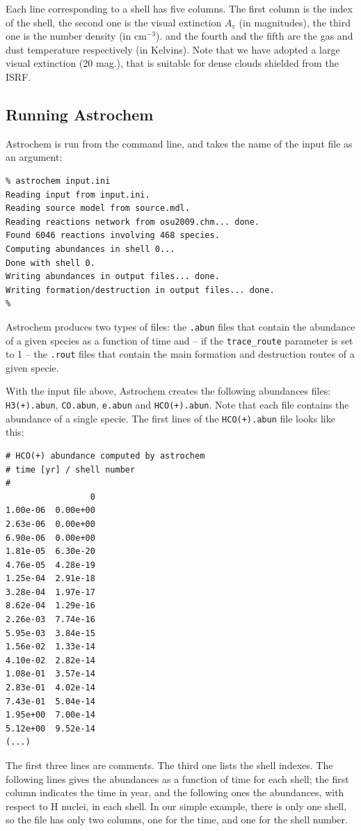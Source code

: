 \documentclass[a4paper,12pt]{article}
\begin{document}
Each line corresponding to a shell has five columns. The first column
is the index of the shell, the second one is the visual extinction
$A_{v}$ (in magnitudes), the third one is the number density (in
cm$^{-3}$). and the fourth and the fifth are the gas and dust
temperature respectively (in Kelvins).  Note that we have adopted a
large visual extinction (20 mag.), that is suitable for dense clouds
shielded from the ISRF.

\subsection{Running Astrochem}
\label{sec:running-astrochem}

Astrochem is run from the command line, and takes the name of the
input file as an argument:

\begin{verbatim}
% astrochem input.ini
Reading input from input.ini.
Reading source model from source.mdl.
Reading reactions network from osu2009.chm... done.
Found 6046 reactions involving 468 species.
Computing abundances in shell 0...
Done with shell 0.
Writing abundances in output files... done.
Writing formation/destruction in output files... done.
%
\end{verbatim}

Astrochem produces two types of files: the \verb=.abun= files that
contain the abundance of a given species as a function of time and --
if the \verb=trace_route= parameter is set to 1 -- the \verb=.rout=
files that contain the main formation and destruction routes of a
given specie.

With the input file above, Astrochem creates the following abundances
files: \verb=H3(+).abun=, \verb=CO.abun=, \verb=e.abun= and
\verb=HCO(+).abun=. Note that each file contains the abundance of a
single specie. The first lines of the \verb=HCO(+).abun= file looks
like this:

\begin{verbatim}
# HCO(+) abundance computed by astrochem
# time [yr] / shell number
#
                 0
1.00e-06  0.00e+00
2.63e-06  0.00e+00
6.90e-06  0.00e+00
1.81e-05  6.30e-20
4.76e-05  4.28e-19
1.25e-04  2.91e-18
3.28e-04  1.97e-17
8.62e-04  1.29e-16
2.26e-03  7.74e-16
5.95e-03  3.84e-15
1.56e-02  1.33e-14
4.10e-02  2.82e-14
1.08e-01  3.57e-14
2.83e-01  4.02e-14
7.43e-01  5.04e-14
1.95e+00  7.00e-14
5.12e+00  9.52e-14
(...)
\end{verbatim}

\noindent
The first three lines are comments. The third one lists the shell
indexes. The following lines gives the abundances as a function of
time for each shell; the first column indicates the time in year, and
the following ones the abundances, with respect to H nuclei, in each
shell. In our simple example, there is only one shell, so the file has
only two columns, one for the time, and one for the shell number.
\end{document}
